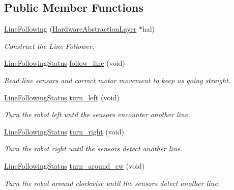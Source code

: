 \subsection*{Public Member Functions}
\begin{DoxyCompactItemize}
\item 
\hyperlink{classIDP_1_1LineFollowing_a0a8b7e1ecdff2e4d0949b01fcf7609ef}{LineFollowing} (\hyperlink{classIDP_1_1HardwareAbstractionLayer}{HardwareAbstractionLayer} $\ast$hal)
\begin{DoxyCompactList}\small\item\em Construct the Line Follower. \item\end{DoxyCompactList}\item 
\hyperlink{namespaceIDP_a5993bdfdd901fc5521c8df42dca43bd0}{LineFollowingStatus} \hyperlink{classIDP_1_1LineFollowing_ad26d7726d2bb263658ed3140d3e30852}{follow\_\-line} (void)
\begin{DoxyCompactList}\small\item\em Read line sensors and correct motor movement to keep us going straight. \item\end{DoxyCompactList}\item 
\hyperlink{namespaceIDP_a5993bdfdd901fc5521c8df42dca43bd0}{LineFollowingStatus} \hyperlink{classIDP_1_1LineFollowing_a551e979a503328c2f645a1af2798d940}{turn\_\-left} (void)
\begin{DoxyCompactList}\small\item\em Turn the robot left until the sensors encounter another line. \item\end{DoxyCompactList}\item 
\hyperlink{namespaceIDP_a5993bdfdd901fc5521c8df42dca43bd0}{LineFollowingStatus} \hyperlink{classIDP_1_1LineFollowing_adc0b67e4dc93dfef246cdde6190b0745}{turn\_\-right} (void)
\begin{DoxyCompactList}\small\item\em Turn the robot right until the sensors detect another line. \item\end{DoxyCompactList}\item 
\hyperlink{namespaceIDP_a5993bdfdd901fc5521c8df42dca43bd0}{LineFollowingStatus} \hyperlink{classIDP_1_1LineFollowing_a5bbdc1317ef04ea599a7d5583703660b}{turn\_\-around\_\-cw} (void)
\begin{DoxyCompactList}\small\item\em Turn the robot around clockwise until the sensors detect another line. \item\end{DoxyCompactList}\item 

\end{DoxyCompactItemize}
